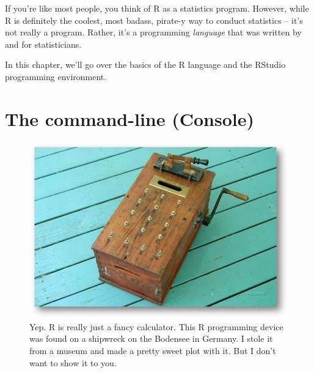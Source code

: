 \documentclass[
]{book}
\newenvironment{Shaded}{\begin{snugshade}}{\end{snugshade}}
\newcommand{\CommentTok}[1]{\textcolor[rgb]{0.56,0.35,0.01}{\textit{#1}}}
\newcommand{\ControlFlowTok}[1]{\textcolor[rgb]{0.13,0.29,0.53}{\textbf{#1}}}
\newcommand{\KeywordTok}[1]{\textcolor[rgb]{0.13,0.29,0.53}{\textbf{#1}}}
\newcommand{\NormalTok}[1]{#1}
\newcommand{\OperatorTok}[1]{\textcolor[rgb]{0.81,0.36,0.00}{\textbf{#1}}}
\newcommand{\StringTok}[1]{\textcolor[rgb]{0.31,0.60,0.02}{#1}}
\begin{document}
\begin{Shaded}
\end{Shaded}

If you're like most people, you think of R as a statistics program. However, while R is definitely the coolest, most badass, pirate-y way to conduct statistics -- it's not really a program. Rather, it's a programming \emph{language} that was written by and for statisticians.

In this chapter, we'll go over the basics of the R language and the RStudio programming environment.

\hypertarget{the-command-line-console}{%
\section{The command-line (Console)}\label{the-command-line-console}}

\begin{figure}

{\centering \includegraphics[width=0.5\linewidth]{images/woodcalc} 

}

\caption{Yep. R is really just a fancy calculator. This R programming device was found on a shipwreck on the Bodensee in Germany. I stole it from a museum and made a pretty sweet plot with it. But I don't want to show it to you.}\label{fig:unnamed-chunk-2}
\end{figure}
\end{document}
